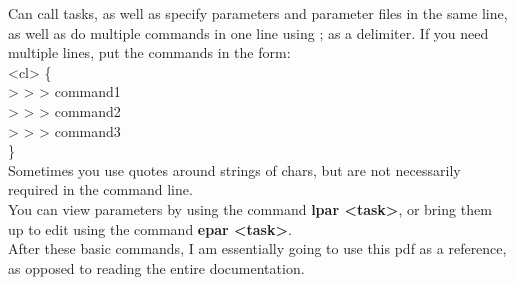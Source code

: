 \documentclass[a4paper]{article}
\begin{document}
Can call tasks, as well as specify parameters and parameter files in the same line, as well as do multiple commands in one line using ; as a delimiter.  If you need multiple lines, put the commands in the form:\\
<cl> \{ \\
 > > > command1 \\
 > > > command2 \\
 > > > command3 \\
 \} \\
Sometimes you use quotes around strings of chars, but are not necessarily required in the command line.  \\
You can view parameters by using the command \textbf{lpar <task>}, or bring them up to edit using the command \textbf{epar <task>}.  \\
After these basic commands, I am essentially going to use this pdf as a reference, as opposed to reading the entire documentation.
\end{document}
